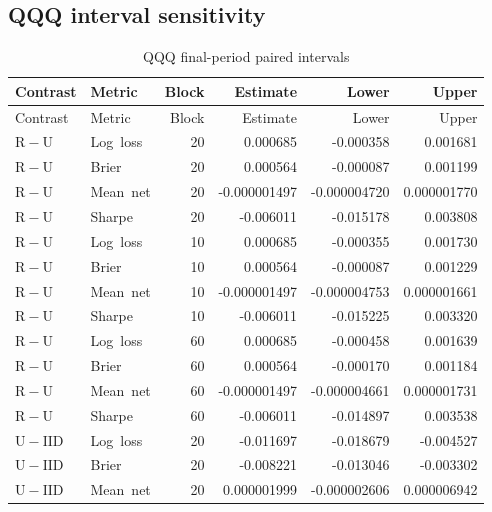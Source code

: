 \subsection{QQQ interval sensitivity}
\begingroup\small\setlength{\tabcolsep}{10pt}\begin{longtable}{llrrrr}
\caption{QQQ final-period paired intervals}\\
\toprule Contrast & Metric & Block & Estimate & Lower & Upper\\\midrule\endfirsthead
\toprule Contrast & Metric & Block & Estimate & Lower & Upper\\\midrule\endhead
\mbox{$\mathrm{R}-\mathrm{U}$} & \mbox{Log loss} & 20 & 0.000685 & -0.000358 & 0.001681\\
\mbox{$\mathrm{R}-\mathrm{U}$} & \mbox{Brier} & 20 & 0.000564 & -0.000087 & 0.001199\\
\mbox{$\mathrm{R}-\mathrm{U}$} & \mbox{Mean net} & 20 & -0.000001497 & -0.000004720 & 0.000001770\\
\mbox{$\mathrm{R}-\mathrm{U}$} & \mbox{Sharpe} & 20 & -0.006011 & -0.015178 & 0.003808\\
\mbox{$\mathrm{R}-\mathrm{U}$} & \mbox{Log loss} & 10 & 0.000685 & -0.000355 & 0.001730\\
\mbox{$\mathrm{R}-\mathrm{U}$} & \mbox{Brier} & 10 & 0.000564 & -0.000087 & 0.001229\\
\mbox{$\mathrm{R}-\mathrm{U}$} & \mbox{Mean net} & 10 & -0.000001497 & -0.000004753 & 0.000001661\\
\mbox{$\mathrm{R}-\mathrm{U}$} & \mbox{Sharpe} & 10 & -0.006011 & -0.015225 & 0.003320\\
\mbox{$\mathrm{R}-\mathrm{U}$} & \mbox{Log loss} & 60 & 0.000685 & -0.000458 & 0.001639\\
\mbox{$\mathrm{R}-\mathrm{U}$} & \mbox{Brier} & 60 & 0.000564 & -0.000170 & 0.001184\\
\mbox{$\mathrm{R}-\mathrm{U}$} & \mbox{Mean net} & 60 & -0.000001497 & -0.000004661 & 0.000001731\\
\mbox{$\mathrm{R}-\mathrm{U}$} & \mbox{Sharpe} & 60 & -0.006011 & -0.014897 & 0.003538\\
\mbox{$\mathrm{U}-\mathrm{IID}$} & \mbox{Log loss} & 20 & -0.011697 & -0.018679 & -0.004527\\
\mbox{$\mathrm{U}-\mathrm{IID}$} & \mbox{Brier} & 20 & -0.008221 & -0.013046 & -0.003302\\
\mbox{$\mathrm{U}-\mathrm{IID}$} & \mbox{Mean net} & 20 & 0.000001999 & -0.000002606 & 0.000006942\\

\end{longtable}
